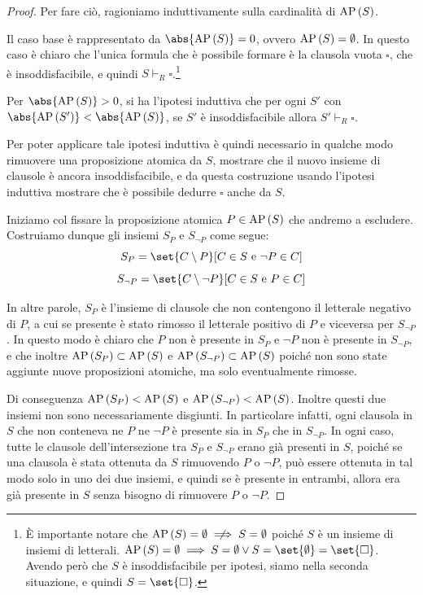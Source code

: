 \begin{proof}
  Per fare ciò, ragioniamo induttivamente sulla cardinalità di \(\AP[S]\).

  Il caso base è rappresentato da \(\abs{\AP[S]} = 0\), ovvero \(\AP[S] = \emptyset\). In questo caso è chiaro che l'unica formula che è possibile formare è la clausola vuota \(\square\), che è insoddisfacibile, e quindi \(S\vdash_R \square\).\footnote{È importante notare che \(\AP[S]=\emptyset\centernot\implies S = \emptyset\) poiché \(S\) è un insieme di insiemi di letterali. \(\AP[S]=\emptyset \implies  S = \emptyset \lor S = \set{\emptyset} = \set{\square}\). Avendo però che \(S\) è insoddisfacibile per ipotesi, siamo nella seconda situazione, e quindi \(S = \set{\square}\).}

  Per \(\abs{\AP[S]}>0\), si ha l'ipotesi induttiva che per ogni \(S'\) con \(\abs{\AP[S']} < \abs{\AP[S]}\), se \(S'\) è insoddisfacibile allora \(S'\vdash_R \square\).

  Per poter applicare tale ipotesi induttiva è quindi necessario in qualche modo rimuovere una proposizione atomica da \(S\), mostrare che il nuovo insieme di clausole è ancora insoddisfacibile, e da questa costruzione usando l'ipotesi induttiva mostrare che è possibile dedurre \(\square\) anche da \(S\).

  Iniziamo col fissare la proposizione atomica \(P\in\AP[S]\) che andremo a escludere. Costruiamo dunque gli insiemi \(S_P\) e \(S_{\neg P}\) come segue:
  \[S_P = \set{C\setminus P}[C\in S \text{ e } \neg P \in C]\]
  \[S_{\neg P} =  \set{C\setminus \neg P}[C\in S \text{ e }  P \in C]\]

  In altre parole, \(S_P\) è l'insieme di clausole che non contengono il letterale negativo di \(P\), a cui se presente è stato rimosso il letterale positivo di \(P\) e viceversa per \(S_{\neg P}\). In questo modo è chiaro che \(P\) non è presente in \(S_P\) e \(\neg P\) non è presente in \(S_{\neg P}\), e che inoltre \(\AP[S_P] \subset \AP[S]\) e \(\AP[S_{\neg P}]\subset \AP[S]\) poiché non sono state aggiunte nuove proposizioni atomiche, ma solo eventualmente rimosse.

  Di conseguenza \(\AP[S_P]<\AP[S]\) e \(\AP[S_{\neg P}]<\AP[S]\).
  Inoltre questi due insiemi non sono necessariamente disgiunti. In particolare infatti, ogni clausola in \(S\) che non conteneva ne \(P\) ne \(\neg P\) è presente sia in \(S_P\) che in \(S_{\neg P}\). In ogni caso, tutte le clausole dell'intersezione tra \(S_P\) e \(S_{\neg P}\) erano già presenti in \(S\), poiché se una clausola è stata ottenuta da \(S\) rimuovendo \(P\) o \(\neg P\), può essere ottenuta in tal modo solo in uno dei due insiemi, e quindi se è presente in entrambi, allora era già presente in \(S\) senza bisogno di rimuovere \(P\) o \(\neg P\).


\end{proof}
